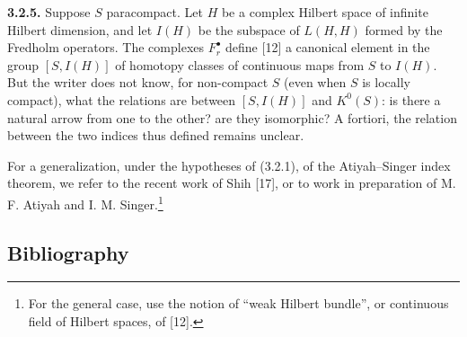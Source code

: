 \textbf{3.2.5.} Suppose $S$ paracompact. Let $H$ be a complex Hilbert space of infinite Hilbert dimension, and let $I(H)$ be the subspace of $L(H,H)$ formed by the Fredholm operators. The complexes $F_r^\bullet$ define [12] a canonical element in the group $[S,I(H)]$ of homotopy classes of continuous maps from $S$ to $I(H)$. But the writer does not know, for non-compact $S$ (even when $S$ is locally compact), what the relations are between $[S,I(H)]$ and $K^0(S)$: is there a natural arrow from one to the other? are they isomorphic? A fortiori, the relation between the two indices thus defined remains unclear.

For a generalization, under the hypotheses of (3.2.1), of the Atiyah--Singer index theorem, we refer to the recent work of Shih [17], or to work in preparation of M. F. Atiyah and I. M. Singer.\footnote{For the general case, use the notion of ``weak Hilbert bundle'', or continuous field of Hilbert spaces, of [12].}

\subsection*{Bibliography}

